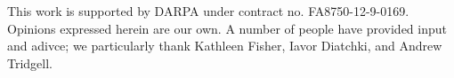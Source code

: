 \documentclass{sigplanconf}
\begin{document}












\acks

This work is supported by DARPA under contract no. FA8750-12-9-0169.  Opinions
expressed herein are our own.  A number of people have provided input and
adivce; we particularly thank Kathleen Fisher, Iavor Diatchki, and Andrew
Tridgell.








\end{document}
